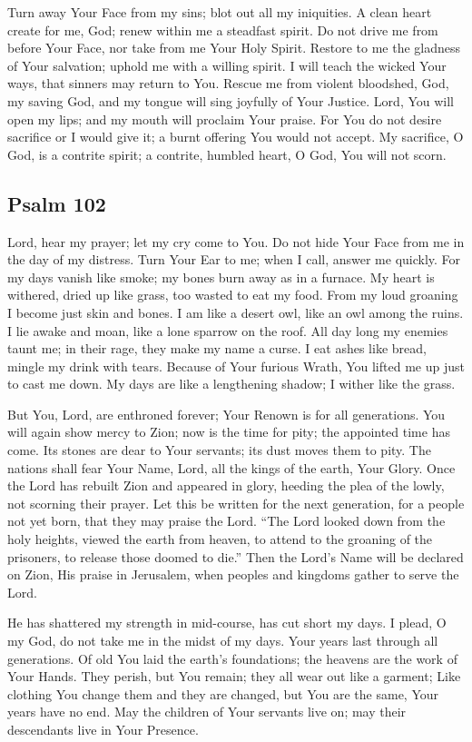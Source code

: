 \documentclass[12pt]{article}
\newcommand{\prayertitle}[1]{\subsection{#1}}
\newcommand{\indulgencedprayertitle}[1]{\prayertitle{#1 \protect\kreuz}}
\begin{document}
Turn away Your Face from my sins;
blot out all my iniquities.
A clean heart create for me, God;
renew within me a steadfast spirit.
Do not drive me from before Your Face, nor take from me Your Holy Spirit.
Restore to me the gladness of Your salvation;
uphold me with a willing spirit.
I will teach the wicked Your ways, that sinners may return to You.
Rescue me from violent bloodshed, God, my saving God, and my tongue will sing joyfully of Your Justice.
Lord, You will open my lips;
and my mouth will proclaim Your praise.
For You do not desire sacrifice or I would give it;
a burnt offering You would not accept.
My sacrifice, O God, is a contrite spirit;
a contrite, humbled heart, O God, You will not scorn.

\indulgencedprayertitle{Psalm 102}
Lord, hear my prayer;
let my cry come to You.
Do not hide Your Face from me in the day of my distress.
Turn Your Ear to me;
when I call, answer me quickly.
For my days vanish like smoke;
my bones burn away as in a furnace.
My heart is withered, dried up like grass, too wasted to eat my food.
From my loud groaning I become just skin and bones.
I am like a desert owl, like an owl among the ruins.
I lie awake and moan, like a lone sparrow on the roof.
All day long my enemies taunt me;
in their rage, they make my name a curse.
I eat ashes like bread, mingle my drink with tears.
Because of Your furious Wrath, You lifted me up just to cast me down.
My days are like a lengthening shadow;
I wither like the grass.

But You, Lord, are enthroned forever;
Your Renown is for all generations.
You will again show mercy to Zion;
now is the time for pity;
the appointed time has come.
Its stones are dear to Your servants;
its dust moves them to pity.
The nations shall fear Your Name, Lord,
all the kings of the earth, Your Glory.
Once the Lord has rebuilt Zion and appeared in glory, heeding the plea of the lowly, not scorning their prayer.
Let this be written for the next generation, for a people not yet born, that they may praise the Lord.
``The Lord looked down from the holy heights, viewed the earth from heaven, to attend to the groaning of the prisoners, to release those doomed to die.''
Then the Lord's Name will be declared on Zion, His praise in Jerusalem, when peoples and kingdoms gather to serve the Lord.

He has shattered my strength in mid-course, has cut short my days.
I plead, O my God, do not take me in the midst of my days.
Your years last through all generations.
Of old You laid the earth's foundations;
the heavens are the work of Your Hands.
They perish, but You remain;
they all wear out like a garment;
Like clothing You change them and they are changed, but You are the same, Your years have no end.
May the children of Your servants live on;
may their descendants live in Your Presence.
\end{document}
